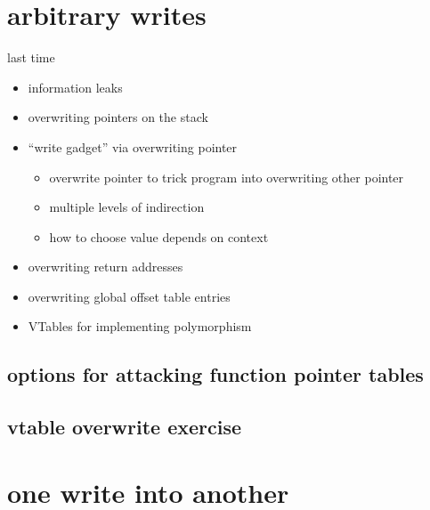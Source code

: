 \date{}
\title{}
\date{}

\begin{frame}
    \titlepage
\end{frame}


\section{arbitrary writes}


\begin{frame}{last time}
    \begin{itemize}
    \item information leaks
    \item overwriting pointers on the stack
    \item ``write gadget'' via overwriting pointer
        \begin{itemize}
        \item overwrite pointer to trick program into overwriting other pointer
        \item multiple levels of indirection
        \item how to choose value depends on context
        \end{itemize}
    \item overwriting return addresses
    \item overwriting global offset table entries
    \item VTables for implementing polymorphism
    \end{itemize}
\end{frame}

\subsection{options for attacking function pointer tables}


\subsection{vtable overwrite exercise}





\section{one write into another}

